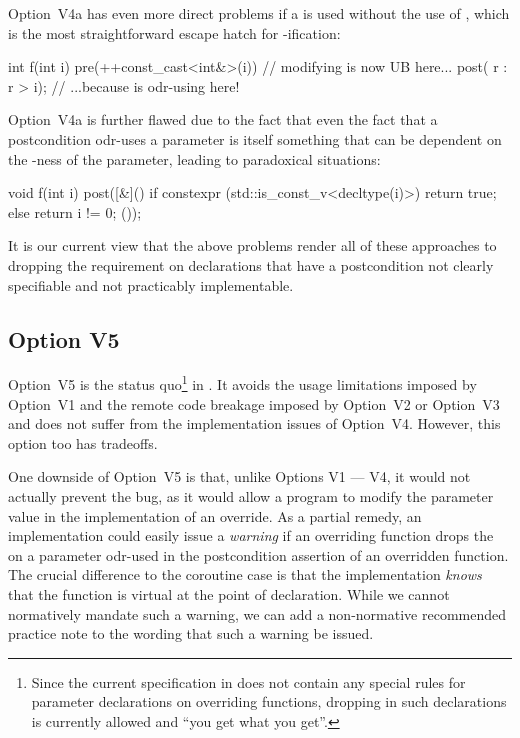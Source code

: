 Option~V4a has even more direct problems if a  is used without the use of , which is the most straightforward escape hatch for -ification:
\begin{codeblock}
int f(int i) 
  pre(++const_cast<int&>(i))  // modifying  is now UB here...
  post( r : r > i);  // ...because  is odr-using  here!
\end{codeblock}

Option~V4a is further flawed due to the fact that even the fact that a postcondition odr-uses a parameter is itself something that can be dependent on the -ness of the parameter, leading to paradoxical situations:
\begin{codeblock}
void f(int i)
  post([&]() {
    if constexpr (std::is_const_v<decltype(i)>) {
      return true; 
    } else {
      return i != 0;
    }
  }());
\end{codeblock}

It is our current view that the above problems render all of these approaches to dropping the  requirement on declarations that have a postcondition not clearly specifiable and not practicably implementable. 

\subsection*{Option V5}

Option~V5 is the status quo\footnote{Since the current specification in \cite{P2900R10} does not contain any special rules for parameter declarations on overriding functions, dropping  in such declarations is currently allowed and ``you get what you get''.} in \cite{P2900R10}. It avoids the usage limitations imposed by Option~V1 and the remote code breakage imposed by Option~V2 or Option~V3 and does not suffer from the implementation issues of Option~V4. However, this option too has tradeoffs.

One downside of Option~V5 is that, unlike Options V1 --- V4, it would not actually prevent the bug, as it would allow a program to modify the parameter value in the implementation of an override. As a partial remedy, an implementation could easily issue a \emph{warning} if an overriding function drops the  on a parameter odr-used in the postcondition assertion of an overridden function. The crucial difference to the coroutine case is that the implementation \emph{knows} that the function is virtual at the point of declaration. While we cannot normatively mandate such a warning, we can add a non-normative recommended practice note to the wording that such a warning be issued. 

